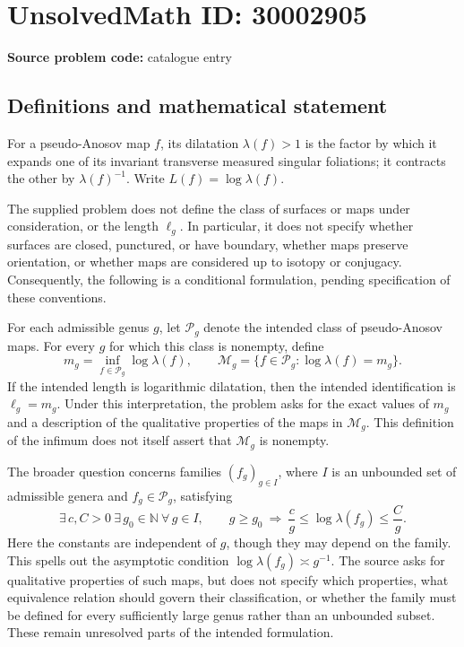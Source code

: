 \documentclass[11pt]{article}
\newcommand{\N}{\mathbb{N}}
\begin{document}
\section*{UnsolvedMath ID: 30002905}
\textbf{Source problem code:} catalogue entry
\subsection{Definitions and mathematical statement}
For a pseudo-Anosov map \(f\), its dilatation \(\lambda(f)>1\) is the factor by which it expands one of its invariant transverse measured singular foliations; it contracts the other by \(\lambda(f)^{-1}\). Write \(L(f)=\log\lambda(f)\).

The supplied problem does not define the class of surfaces or maps under consideration, or the length \(\ell_g\). In particular, it does not specify whether surfaces are closed, punctured, or have boundary, whether maps preserve orientation, or whether maps are considered up to isotopy or conjugacy. Consequently, the following is a conditional formulation, pending specification of these conventions.

For each admissible genus \(g\), let \(\mathcal P_g\) denote the intended class of pseudo-Anosov maps. For every \(g\) for which this class is nonempty, define
\[
 m_g=\inf_{f\in\mathcal P_g}\log\lambda(f),
 \qquad
 \mathcal M_g=\{f\in\mathcal P_g:\log\lambda(f)=m_g\}.
\]
If the intended length is logarithmic dilatation, then the intended identification is \(\ell_g=m_g\). Under this interpretation, the problem asks for the exact values of \(m_g\) and a description of the qualitative properties of the maps in \(\mathcal M_g\). This definition of the infimum does not itself assert that \(\mathcal M_g\) is nonempty.

The broader question concerns families \((f_g)_{g\in I}\), where \(I\) is an unbounded set of admissible genera and \(f_g\in\mathcal P_g\), satisfying
\[
 \exists\,c,C>0\ \exists\,g_0\in\N\ \forall\,g\in I,
 \qquad
 g\ge g_0\ \Longrightarrow\
 \frac{c}{g}\le\log\lambda(f_g)\le\frac{C}{g}.
\]
Here the constants are independent of \(g\), though they may depend on the family. This spells out the asymptotic condition \(\log\lambda(f_g)\asymp g^{-1}\). The source asks for qualitative properties of such maps, but does not specify which properties, what equivalence relation should govern their classification, or whether the family must be defined for every sufficiently large genus rather than an unbounded subset. These remain unresolved parts of the intended formulation.
\end{document}
